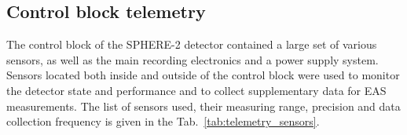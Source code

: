 \documentclass[universe,article,submit,moreauthors,pdftex]{Definitions/mdpi}
\begin{document}
\subsection{Control block telemetry}

The control block of the SPHERE-2 detector contained a large set of various sensors, as well as the main recording electronics and a power supply system. Sensors located both inside and outside of the control block were used to monitor the detector state and performance and to collect supplementary data for EAS measurements. The list of sensors used, their measuring range, precision and data collection frequency is given in the Tab.~\ref{tab:telemetry_sensors}. 
\end{document}
